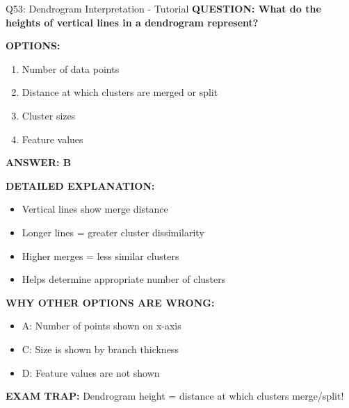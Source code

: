 \documentclass[8pt]{beamer}
\begin{document}
	\begin{frame}{Q53: Dendrogram Interpretation - Tutorial}
		\fontsize{6.5}{7.5}\selectfont
		\textbf{QUESTION: What do the heights of vertical lines in a dendrogram represent?}
		
		\vspace{0.1cm}
		\textbf{OPTIONS:}
		\begin{enumerate}
			\item Number of data points
			\item Distance at which clusters are merged or split
			\item Cluster sizes
			\item Feature values
		\end{enumerate}
		
		\vspace{0.1cm}
		\textcolor{myblue}{\textbf{ANSWER: B}}
		
		\vspace{0.1cm}
		\textbf{DETAILED EXPLANATION:}
		\begin{itemize}
			\item Vertical lines show merge distance
			\item Longer lines = greater cluster dissimilarity
			\item Higher merges = less similar clusters
			\item Helps determine appropriate number of clusters
		\end{itemize}
		
		\vspace{0.1cm}
		\textcolor{myred}{\textbf{WHY OTHER OPTIONS ARE WRONG:}}
		\begin{itemize}
			\item \textcolor{myred}{A:} Number of points shown on x-axis
			\item \textcolor{myred}{C:} Size is shown by branch thickness
			\item \textcolor{myred}{D:} Feature values are not shown
		\end{itemize}
		
		\textcolor{myred}{\textbf{EXAM TRAP:}} Dendrogram height = \textcolor{myblue}{distance at which clusters merge/split}!
	\end{frame}
	
\end{document}
